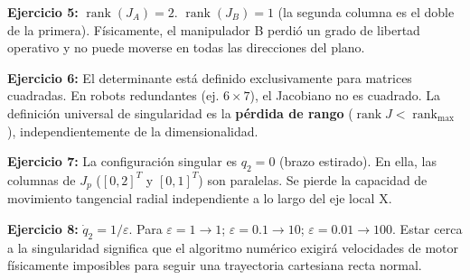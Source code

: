 \documentclass[11pt, a4paper]{article}
\begin{document}
\textbf{Ejercicio 5:} $\operatorname{rank}(J_A) = 2$. $\operatorname{rank}(J_B) = 1$ (la segunda columna es el doble de la primera). Físicamente, el manipulador B perdió un grado de libertad operativo y no puede moverse en todas las direcciones del plano.

\textbf{Ejercicio 6:} El determinante está definido exclusivamente para matrices cuadradas. En robots redundantes (ej. $6 \times 7$), el Jacobiano no es cuadrado. La definición universal de singularidad es la \textbf{pérdida de rango} ($\operatorname{rank} J < \operatorname{rank}_{\max}$), independientemente de la dimensionalidad.

\textbf{Ejercicio 7:} La configuración singular es $q_2 = 0$ (brazo estirado). En ella, las columnas de $J_p$ ($[0, 2]^T$ y $[0, 1]^T$) son paralelas. Se pierde la capacidad de movimiento tangencial radial independiente a lo largo del eje local X.

\textbf{Ejercicio 8:} $\dot{q}_2 = 1/\varepsilon$. Para $\varepsilon = 1 \to 1$; $\varepsilon = 0.1 \to 10$; $\varepsilon = 0.01 \to 100$. Estar cerca a la singularidad significa que el algoritmo numérico exigirá velocidades de motor físicamente imposibles para seguir una trayectoria cartesiana recta normal.

\vspace{0.5cm}
\end{document}
